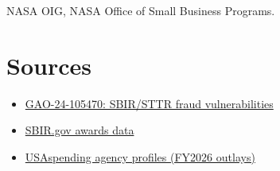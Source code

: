 \documentclass[letterpaper,11pt]{article}
\providecommand{\tightlist}{\setlength{\itemsep}{0pt}\setlength{\parskip}{0pt}}
\begin{document}
NASA OIG, NASA Office of Small Business Programs.

\hypertarget{sources}{%
\section{Sources}\label{sources}}

\begin{itemize}
\tightlist
\item
  \href{https://www.gao.gov/products/GAO-24-105470}{GAO-24-105470:
  SBIR/STTR fraud vulnerabilities}
\item
  \href{https://www.sbir.gov/awards}{SBIR.gov awards data}
\item
  \href{https://www.usaspending.gov/agency}{USAspending agency profiles
  (FY2026 outlays)}
\end{itemize}
\end{document}
